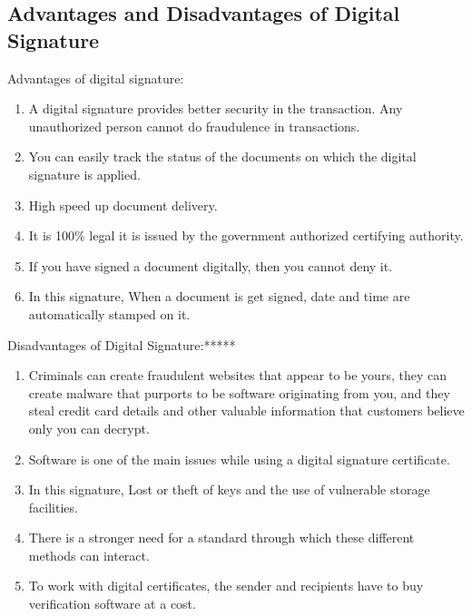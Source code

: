 \documentclass[a4paper]{article}
\begin{document}
\subsection{Advantages and Disadvantages of Digital Signature}
Advantages of digital signature:
\begin{enumerate}
  \item A digital signature provides better security in the transaction. Any unauthorized person cannot do fraudulence in transactions.
  \item You can easily track the status of the documents on which the digital signature is applied.
  \item High speed up document delivery.
  \item It is 100\% legal it is issued by the government authorized certifying authority.
  \item If you have signed a document digitally, then you cannot deny it.
  \item In this signature, When a document is get signed, date and time are automatically stamped on it.
\end{enumerate}
Disadvantages of Digital Signature:*****
\begin{enumerate}
\item Criminals can create fraudulent websites that appear to be yours, they can create malware that purports to be software originating from you, and they steal credit card details and other valuable information that customers believe only you can decrypt.
\item Software is one of the main issues while using a digital signature certificate.
\item In this signature, Lost or theft of keys and the use of vulnerable storage facilities.
\item There is a stronger need for a standard through which these different methods can interact.
\item To work with digital certificates, the sender and recipients have to buy verification software at a cost.
\end{enumerate}
\end{document}
